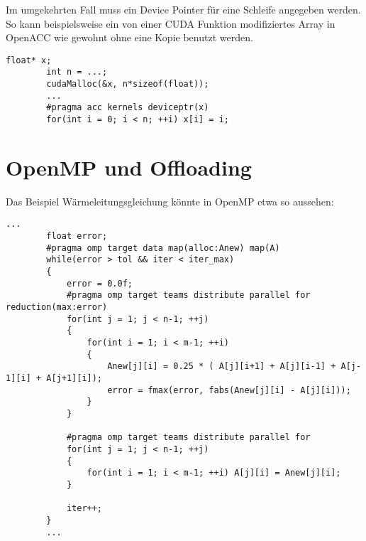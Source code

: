 		Im umgekehrten Fall muss ein Device Pointer für eine Schleife angegeben werden. So kann beispielsweise ein von einer CUDA Funktion modifiziertes Array in OpenACC wie gewohnt ohne eine Kopie benutzt werden.
		\begin{lstlisting}[caption=OpenACC/CUDA Zusammenspiel: Device Memory]
		float* x;
		int n = ...;
		cudaMalloc(&x, n*sizeof(float));
		...
		#pragma acc kernels deviceptr(x)
		for(int i = 0; i < n; ++i) x[i] = i;
		\end{lstlisting}
			
		\newpage
		\section{OpenMP und Offloading}
		Das Beispiel Wärmeleitungsgleichung könnte in OpenMP etwa so aussehen:
		\begin{lstlisting}[caption=OpenMP: Offloading]
		...
		float error;
		#pragma omp target data map(alloc:Anew) map(A)
		while(error > tol && iter < iter_max)
		{
			error = 0.0f;
			#pragma omp target teams distribute parallel for reduction(max:error)
			for(int j = 1; j < n-1; ++j)
			{
				for(int i = 1; i < m-1; ++i)
				{
					Anew[j][i] = 0.25 * ( A[j][i+1] + A[j][i-1] + A[j-1][i] + A[j+1][i]);
					error = fmax(error, fabs(Anew[j][i] - A[j][i]));
				}
			}
			
			#pragma omp target teams distribute parallel for
			for(int j = 1; j < n-1; ++j)
			{
				for(int i = 1; i < m-1; ++i) A[j][i] = Anew[j][i];
			}
			
			iter++;
		}
		...
		\end{lstlisting}
